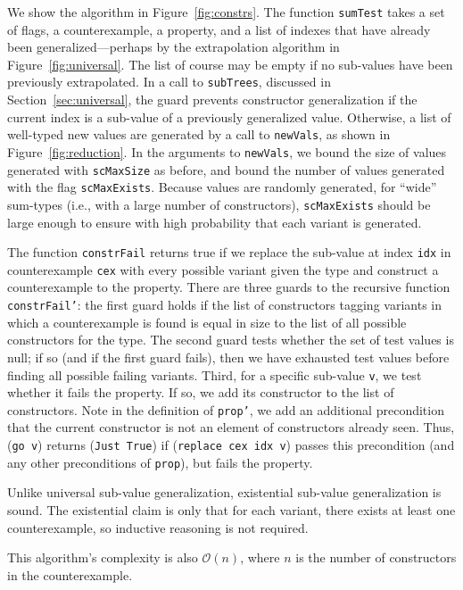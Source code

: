 \documentclass{sigplanconf}
\newcommand{\ttp}[1]{\texttt{#1}}
\begin{document}
We show the algorithm in Figure~\ref{fig:constrs}.  The function \ttp{sumTest}
takes a set of flags, a counterexample, a property, and a list of indexes that
have already been generalized---perhaps by the extrapolation algorithm in
Figure~\ref{fig:universal}.  The list of course may be empty if no sub-values
have been previously extrapolated.  In a call to \ttp{subTrees}, discussed in
Section~\ref{sec:universal}, the guard prevents constructor generalization if
the current index is a sub-value of a previously generalized value.  Otherwise,
a list of well-typed new values are generated by a call to \ttp{newVals}, as
shown in Figure~\ref{fig:reduction}.  In the arguments to \ttp{newVals}, we
bound the size of values generated with \ttp{scMaxSize} as before, and bound the
number of values generated with the flag \ttp{scMaxExists}.  Because values are
randomly generated, for ``wide'' sum-types (i.e., with a large number of
constructors), \ttp{scMaxExists} should be large enough to ensure with high
probability that each variant is generated.

The function \ttp{constrFail} returns true if we replace the sub-value at index
\ttp{idx} in counterexample \ttp{cex} with every possible variant given the type
and construct a counterexample to the property.  There are three guards to the
recursive function \ttp{constrFail'}: the first guard holds if the list of
constructors tagging variants in which a counterexample is found is equal in
size to the list of all possible constructors for the type.  The second guard
tests whether the set of test values is null; if so (and if the first guard
fails), then we have exhausted test values before finding all possible failing
variants.  Third, for a specific sub-value \ttp{v}, we test whether it fails the
property.  If so, we add its constructor to the list of constructors.  Note in
the definition of \ttp{prop'}, we add an additional precondition that the
current constructor is not an element of constructors already seen.  Thus,
(\ttp{go v}) returns (\ttp{Just True}) if (\ttp{replace cex idx v}) passes this
precondition (and any other preconditions of \ttp{prop}), but fails the
property.

Unlike universal sub-value generalization, existential sub-value generalization
is sound.  The existential claim is only that for each variant, there exists at
least one counterexample, so inductive reasoning is not required.

This algorithm's complexity is also $\mathcal{O}(n)$, where $n$ is the number of
constructors in the counterexample.
\end{document}
